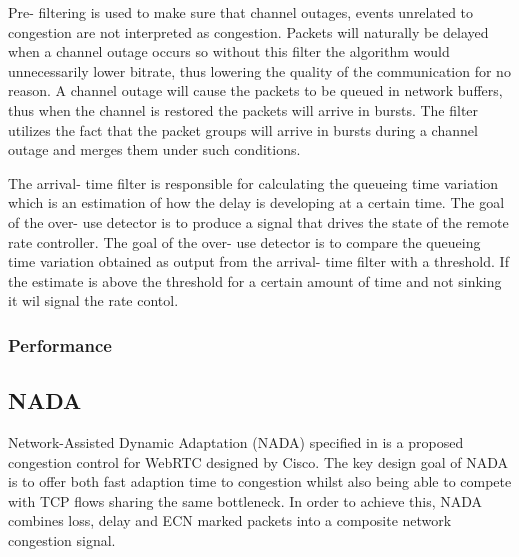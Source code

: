  Pre- filtering is used to make sure that channel outages, events unrelated to congestion are not interpreted as congestion.
Packets will naturally be delayed when a channel outage occurs so without this filter the algorithm would unnecessarily lower bitrate, thus lowering the quality of the communication for no reason.
A channel outage will cause the packets to be queued in network buffers, thus when the channel is restored the packets will arrive in bursts. 
The filter utilizes the fact that the packet groups will arrive in bursts during a channel outage and merges them under such conditions.

The arrival- time filter is responsible for calculating the queueing time variation which is an estimation of how the delay is developing at a certain time.
The goal of the over- use detector is to produce a signal that drives the state of the remote rate controller. 
The goal of the over- use detector is to compare the queueing time variation obtained as output from the arrival- time filter with a threshold. If the estimate is above the threshold for a certain amount of time and not sinking it wil signal the rate contol.
\subsubsection{Performance}
\subsection{NADA}
Network-Assisted Dynamic Adaptation (NADA) \cite{XiaoqingZhu2013NAUC} specified in \cite{rfc8698} is a proposed congestion control for WebRTC designed by Cisco.
The key design goal of NADA is to offer both fast adaption time to congestion whilst also being able to compete with TCP flows sharing the same bottleneck.
In order to achieve this, NADA combines loss, delay and ECN marked packets into a composite network congestion signal.
